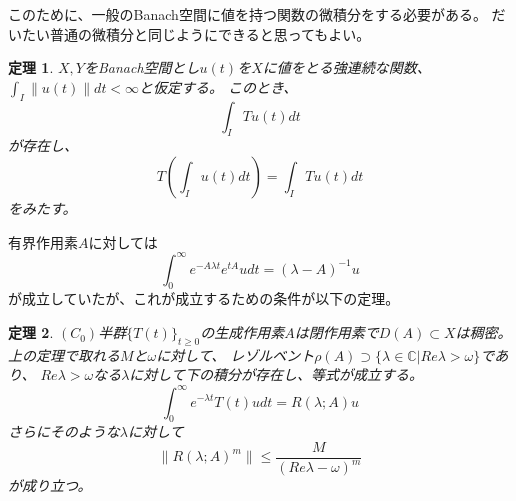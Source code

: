 \documentclass{jsarticle}
\newtheorem{thm}{定理}
\newcommand{\C}{\mathbb{C}}
\newcommand{\norm}[1]{\|#1\|}
\begin{document}
このために、一般のBanach空間に値を持つ関数の微積分をする必要がある。
だいたい普通の微積分と同じようにできると思ってもよい。
\begin{thm}
$X, Y$をBanach空間とし$u(t)$を$X$に値をとる強連続な関数、$\int_I\norm{u(t)}dt<\infty$と仮定する。
このとき、
\[
\int_ITu(t)dt
\]
が存在し、
\[
T(\int_Iu(t)dt)=\int_ITu(t)dt
\]
をみたす。
\end{thm}

有界作用素$A$に対しては
\[
\int^\infty_0e^{-A\lambda t}e^{tA}udt=(\lambda-A)^{-1}u
\]
が成立していたが、これが成立するための条件が以下の定理。

\begin{thm}
$(C_0)$半群$\{T(t)\}_{t\geq0}$の生成作用素$A$は閉作用素で$D(A)\subset X$は稠密。
上の定理で取れる$M$と$\omega$に対して、
レゾルベント$\rho(A)\supset\{\lambda\in\C\vert Re\lambda>\omega\}$であり、
$Re\lambda>\omega$なる$\lambda$に対して下の積分が存在し、等式が成立する。
\[
\int^\infty_0e^{-\lambda t}T(t)udt=R(\lambda;A)u
\]
さらにそのような$\lambda$に対して
\[
\norm{R(\lambda;A)^m}\leq\frac{M}{(Re\lambda-\omega)^m}
\]
が成り立つ。
\end{thm}
\end{document}
